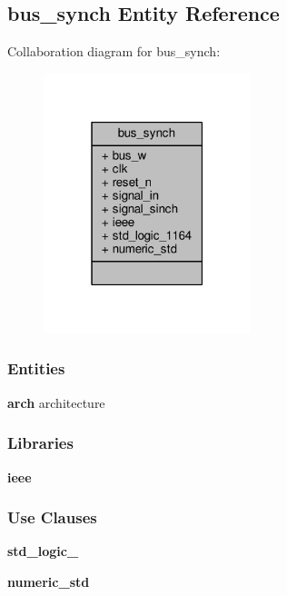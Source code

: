\subsection{bus\+\_\+synch Entity Reference}
\label{classbus__synch}


Collaboration diagram for bus\+\_\+synch\+:\nopagebreak
\begin{figure}[H]
\begin{center}
\leavevmode
\includegraphics[width=171pt]{d6/d7b/classbus__synch__coll__graph}
\end{center}
\end{figure}
\subsubsection*{Entities}
\begin{DoxyCompactItemize}
\item 
{\bf arch} architecture
\end{DoxyCompactItemize}
\subsubsection*{Libraries}
 \begin{DoxyCompactItemize}
\item 
{\bf ieee} 
\end{DoxyCompactItemize}
\subsubsection*{Use Clauses}
 \begin{DoxyCompactItemize}
\item 
{\bf std\+\_\+logic\+\_}   
\item 
{\bf numeric\+\_\+std}   
\end{DoxyCompactItemize}
